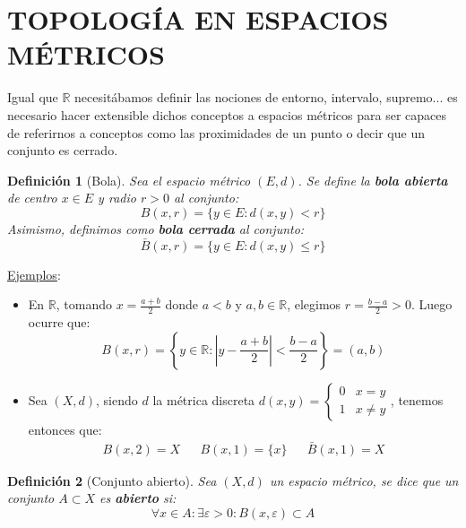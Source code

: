 \documentclass[10pt,a4paper,openright]{book}
\theoremstyle{break}
\newtheorem*{defi}{Definición}
\begin{document}
\section*{TOPOLOGÍA EN ESPACIOS MÉTRICOS}
Igual que $\mathbb{R}$ necesitábamos definir las nociones de entorno, intervalo, supremo... es necesario hacer extensible dichos conceptos a espacios métricos para ser capaces de referirnos a conceptos como las proximidades de un punto o decir que un conjunto es cerrado.

\begin{defi}[Bola]
Sea el espacio métrico $(E,d)$. Se define la \textbf{bola abierta} de centro $x\in E$ y radio $r>0$ al conjunto:
$$B(x,r) = \{y \in E : d(x,y) < r\}$$
Asimismo, definimos como \textbf{bola cerrada} al conjunto:
$$\bar{B}(x,r) = \{y \in E : d(x,y) \leq r\}$$
\end{defi}

\underline{Ejemplos}:
\begin{itemize}
\item En $\mathbb{R}$, tomando $x = \frac{a+b}{2}$ donde $a < b$ y $a,b \in \mathbb{R}$, elegimos $r = \frac{b-a}{2} > 0$. Luego ocurre que:
$$B(x,r) = \left\lbrace y \in \mathbb{R} : \left| y - \frac{a+b}{2}\right| < \frac{b-a}{2}\right\rbrace = (a,b)$$

\item Sea $(X,d)$, siendo $d$ la métrica discreta $d(x,y) = \begin{cases} 0 & x=y \\ 1 & x \neq y \end{cases}$, tenemos entonces que:
\begin{align*}
B(x,2) = X && B(x,1) = \{x\} && \bar{B}(x,1) = X
\end{align*}
\end{itemize}

\begin{defi}[Conjunto abierto]
Sea $(X,d)$ un espacio métrico, se dice que un conjunto $A \subset X$ es \textbf{abierto} si:
$$\forall x \in A : \exists \varepsilon > 0 : B(x,\varepsilon) \subset A$$
\end{defi}
\end{document}
